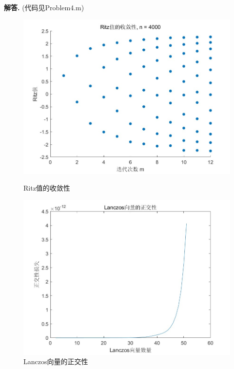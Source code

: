 \documentclass[12pt, a4paper, oneside, UTF8]{ctexart}
\newenvironment{solution}{\par\noindent\textbf{解答. }}{\par}
\begin{document}
\begin{solution}
    (代码见Problem4.m)
    \begin{figure}[h]
        \centering
        \begin{minipage}[b]{0.45\textwidth}
            \centering
            \includegraphics[width=\textwidth]{Problem4_Ritz.jpg}
            \caption{Ritz值的收敛性}
        \end{minipage}
        \begin{minipage}[b]{0.45\textwidth}
            \centering
            \includegraphics[width=\textwidth]{Problem4_Ortho.jpg}
            \caption{Lanczos向量的正交性}
        \end{minipage}
    \end{figure}
\end{solution}
\end{document}
